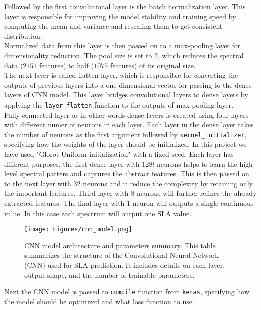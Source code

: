 \documentclass[12pt,a4paper]{report}
\begin{document}
Followed by the first convolutional layer is the batch normalization layer. This layer is responsible for improving the model stability and training speed by computing the mean and variance and rescaling them to get consistent distribution.\\

Normalized data from this layer is then passed on to a max-pooling layer for dimensionality reduction. The pool size is set to $2$, which reduces the spectral data ($2151$ features) to half ($1075$ features) of its original size. \\

The next layer is called flatten layer, which is responsible for converting the outputs of previous layers into a one dimensional vector for passing to the dense layers of CNN model. This layer bridges convolutional layers to dense layers by applying the \texttt{layer\_flatten} function to the outputs of max-pooling layer. \\

Fully connected layer or in other words dense layers is created using four layers with different numer of neurons in each layer. Each layer in the dense layer takes the number of neurons as the first argument followed by \texttt{kernel\_initializer}, specifying how the weights of the layer should be initialized. In this project we have used "Glorot Uniform initialization" with a fixed seed. Each layer has different purposes, the first dense layer with $128l$ neurons helps to learn the high level spectral patters and captures the abstract features. This is then passed on to the next layer with $32$ neurons and it reduce the complexity by retaining only the important features. Third layer with $8$ neurons will further refines the already extracted features. The final layer with $1$ neuron will outputs a single continuous value. In this case each spectrum will output one SLA value.\\

\begin{figure}[h]
    \centering
    \texttt{[image: Figures/cnn\_model.png]}
    \caption{CNN model architecture and parameters summary. This table summarizes the structure of the Convolutional Neural Network (CNN) used for SLA prediction. It includes details on each layer, output shape, and the number of trainable parameters.}
    \label{fig:cnn_model}
\end{figure}

Next the CNN model is passed to \texttt{compile} function from \texttt{keras}, specifying how the model should be optimized and what loss function to use. \\
\end{document}
